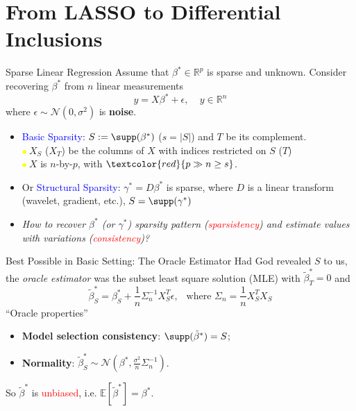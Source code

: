 \documentclass[slidestop,compress,9pt,epsfig,color]{beamer}
\providecommand{\RR}{\mathbb{R}}
\providecommand{\Nm}{\mathcal{N}}
\providecommand{\E}{\mathbb{E}}
\theoremstyle{example}
\providecommand{\subitem}{\\ \textcolor{yellow}{$\bullet\ $}}
\begin{document}
\section[LASSO vs. Differential Inclusions]{From LASSO to Differential Inclusions}

\begin{frame}{Sparse Linear Regression}
Assume that $\beta^*\in\RR^p$ is sparse and unknown. Consider recovering  $\beta^*$ from $n$ linear measurements
\[ y = X \beta^* + \epsilon, \ \ \ \ \ y\in \RR^n\]
where $\epsilon\sim \Nm(0,\sigma^2)$ is \textbf{noise}. 
\begin{itemize}
\item \textcolor{blue}{Basic Sparsity}: $S:=\supp(\beta^*)$ ($s=|S|$) and $T$ be its complement.
\subitem $X_S$ ($X_T$) be the columns of $X$ with indices restricted on $S$ ($T$)
\subitem $X$ is $n$-by-$p$, with $\textcolor{red}{p\gg n\geq s}$.
\item Or \textcolor{blue}{Structural Sparsity}: $\gamma^*=D \beta^*$ is sparse, where $D$ is a linear transform (wavelet, gradient, etc.), $S=\supp(\gamma^*)$
\item \emph{How to recover $\beta^*$ (or $\gamma^*$) sparsity pattern (\textcolor{red}{sparsistency}) and estimate values with variations (\textcolor{red}{consistency})?} 
\end{itemize}
\end{frame}

\begin{frame}{Best Possible in Basic Setting: The Oracle Estimator}
Had God revealed $S$ to us, the \emph{oracle estimator} was the subset least square solution (MLE) with $\tilde{\beta}^*_T=0$ and %
\begin{equation} \label{eq:oracle}
\tilde{\beta}_S^* = \beta^*_S + \frac{1}{n} \Sigma_n^{-1}  X_S^T \epsilon,\ \  \mbox{ where $\Sigma_n=\frac{1}{n} X_S^T X_S$}%
\end{equation}
``Oracle properties''
\begin{itemize}
\item \textbf{Model selection consistency}: $\supp(\tilde{\beta}^*)=S$;
\item \textbf{Normality}: $\tilde{\beta}^*_S \sim \Nm(\beta^*, \frac{\sigma^2}{n}\Sigma_n^{-1})$.
\end{itemize}
So $\tilde{\beta}^*$ is \textcolor{red}{unbiased}, i.e. $\E[\tilde{\beta}^*]=\beta^*$.
\end{frame}
\end{document}
